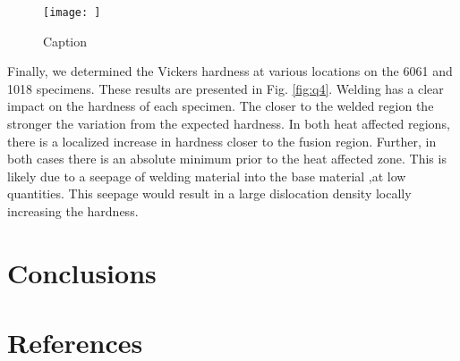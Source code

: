 \documentclass{article}
\begin{document}
\begin{figure}
    \centering
    \texttt{[image: ]}
    \caption{Caption}
    \label{fig:enter-label}
\end{figure}

Finally, we determined the Vickers hardness at various locations on the 6061 and 1018 specimens. These results are presented in Fig. \ref{fig:q4}.
Welding has a clear impact on the hardness of each specimen. The closer to the welded region the stronger the variation from the expected hardness. In both heat affected regions, there is a localized increase in hardness closer to the fusion region. Further, in both cases there is an absolute minimum prior to the heat affected zone. This is likely due to a seepage of welding material into the base material ,at low quantities. This seepage would result in a large dislocation density locally increasing the hardness.

\section{Conclusions}

\section{References}

\printbibliography[heading = none]
\end{document}
